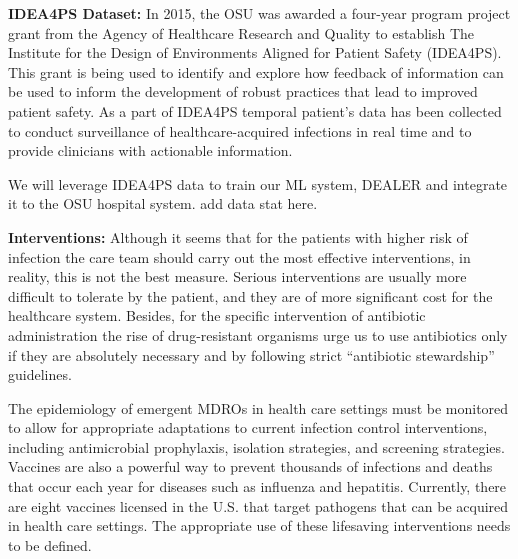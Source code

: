 

{\bf IDEA4PS Dataset:}
In 2015, the OSU was awarded a four-year program project grant from the Agency of Healthcare Research and Quality to establish The Institute for the Design of Environments Aligned for Patient Safety (IDEA4PS). This grant is being used to identify and explore how feedback of information can be used to inform the development of robust practices that lead to improved patient safety. As a part of IDEA4PS temporal patient's data has been collected to conduct surveillance of healthcare-acquired infections in real time and to provide clinicians with actionable information.

We will leverage IDEA4PS data to train our ML system, DEALER and integrate it to the OSU hospital system. {\color{red} add data stat here. }


{\bf Interventions:}
Although it seems that for the patients with higher risk of infection the care team should carry out the most effective interventions, in reality, this is not the best measure. Serious interventions are usually more difficult to tolerate by the patient, and they are of more significant cost for the healthcare system. Besides, for the specific intervention of antibiotic administration the rise of drug-resistant organisms urge us to use antibiotics only if they are absolutely necessary and by following strict ``antibiotic stewardship'' guidelines.

The epidemiology of emergent MDROs in health care settings must be monitored to allow for appropriate adaptations to current infection control interventions, including antimicrobial prophylaxis, isolation strategies, and screening strategies. Vaccines are also a powerful way to prevent thousands of infections and deaths that occur each year for diseases such as influenza and hepatitis. Currently, there are eight vaccines licensed in the U.S. that target pathogens that can be acquired in health care settings. The appropriate use of these lifesaving interventions needs to be defined.

